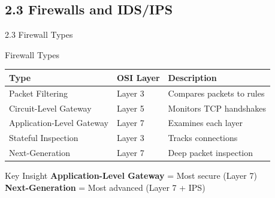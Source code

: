 \documentclass{beamer}
\begin{document}
	\subsection{2.3 Firewalls and IDS/IPS}
	\begin{frame}{2.3 Firewall Types}
		\begin{block}{Firewall Types}
			\begin{tabular}{|p{3cm}|p{4cm}|p{4cm}|}
				\hline
				\textbf{Type} & \textbf{OSI Layer} & \textbf{Description} \\
				\hline
				Packet Filtering & Layer 3 & Compares packets to rules \\
				\hline
				Circuit-Level Gateway & Layer 5 & Monitors TCP handshakes \\
				\hline
				Application-Level Gateway & Layer 7 & Examines each layer \\
				\hline
				Stateful Inspection & Layer 3 & Tracks connections \\
				\hline
				Next-Generation & Layer 7 & Deep packet inspection \\
				\hline
			\end{tabular}
		\end{block}
		
		\begin{exampleblock}{Key Insight}
			\textbf{Application-Level Gateway} = Most secure (Layer 7) \\
			\textbf{Next-Generation} = Most advanced (Layer 7 + IPS)
		\end{exampleblock}
	\end{frame}
	
\end{document}

